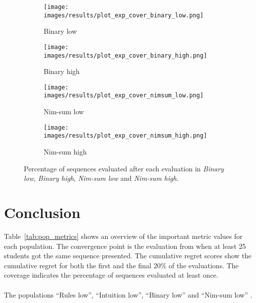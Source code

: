 

\begin{figure}[ht]
	\begin{subfigure}{0.49\linewidth}
	\centering
	\texttt{[image: images/results/plot\_exp\_cover\_binary\_low.png]}
	\caption{Binary low}
	\label{fig:exp_cover_binary_low}
	\end{subfigure}
	\hfill
	\begin{subfigure}{0.49\linewidth}
	\centering
	\texttt{[image: images/results/plot\_exp\_cover\_binary\_high.png]}
	\caption{Binary high}
	\label{fig:exp_cover_binary_high}
	\end{subfigure}
	\begin{subfigure}{0.49\linewidth}
	\centering
	\texttt{[image: images/results/plot\_exp\_cover\_nimsum\_low.png]}
	\caption{Nim-sum low}
	\label{fig:exp_cover_nimsum_low}
	\end{subfigure}
	\hfill
	\begin{subfigure}{0.49\linewidth}
	\centering
	\texttt{[image: images/results/plot\_exp\_cover\_nimsum\_high.png]}
	\caption{Nim-sum high}
	\label{fig:exp_cover_nimsum_high}
	\end{subfigure}
	\caption[Percentage sequences evaluated in Binary and Nim-sum]{Percentage of sequences evaluated after each evaluation in
	\emph{Binary low}, \emph{Binary high}, \emph{Nim-sum low} and \emph{Nim-sum
	high}.}
	\label{fig:exp_cover2}
\end{figure}

\section{Conclusion}
Table~\ref{tab:pop_metrics} shows an overview of the important metric values
for each population. The convergence point is the evaluation from when at least
25 students got the same sequence presented. The cumulative regret scores show
the cumulative regret for both the first and the final 20\% of the evaluations.
The coverage indicates the percentage of sequences evaluated at least once.\\\\
\noindent
The populations ``Rules low'', ``Intuition low'', ``Binary low'' and ``Nim-sum
low'' .

